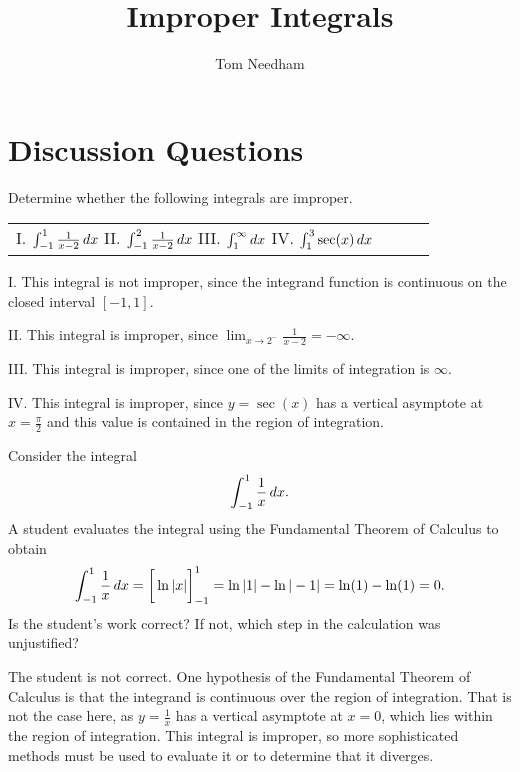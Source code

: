\documentclass[]{ximera}
\author{Tom Needham}
\title[]{Improper Integrals}
\begin{document}
\begin{abstract}
\end{abstract}
\maketitle

\vspace{-0.7in}

\section{Discussion Questions}

\begin{problem}
Determine whether the following integrals are improper.
\begin{center}
\begin{tabular}{llll}
I. $\int_{-1}^1 \frac{1}{x-2} \mathop{}\!d x$ \hspace{.2in} II. $\int_{-1}^2 \frac{1}{x-2} \mathop{}\!d x$ \hspace{.2in} III. $\int_1^\infty \mathop{}\!d x$ \hspace{.2in} IV. $\int_1^3 \sec (x) \mathop{}\!d x$
\end{tabular}
\end{center}
\end{problem}

\begin{freeResponse}
I. This integral is not improper, since the integrand function is continuous on the closed interval $[-1,1]$.

II. This integral is improper, since $\lim_{x \rightarrow 2^-} \frac{1}{x-2} = -\infty$.

III. This integral is improper, since one of the limits of integration is $\infty$.

IV. This integral is improper, since $y=\sec(x)$ has a vertical asymptote at $x = \frac{\pi}{2}$ and this value is contained in the region of integration.
\end{freeResponse}

\begin{problem}
Consider the integral
$$
\int_{-1}^1 \frac{1}{x} \mathop{}\!d x.
$$
A student evaluates the integral using the Fundamental Theorem of Calculus to obtain
$$
\int_{-1}^1 \frac{1}{x} \mathop{}\!d x = \bigg[  \ln |x|  \bigg]_{-1}^1 = \ln |1| - \ln |-1| = \ln (1)  - \ln (1) = 0.
$$
Is the student's work correct? If not, which step in the calculation was unjustified?
\end{problem}

\begin{freeResponse}
The student is not correct. One hypothesis of the  Fundamental Theorem of Calculus is that the integrand is continuous over the region of integration. That is not the case here, as $y=\frac{1}{x}$ has a vertical asymptote at $x=0$, which lies within the region of integration. This integral is improper, so more sophisticated methods must be used to evaluate it or to determine that it diverges.
\end{freeResponse}
\end{document}

